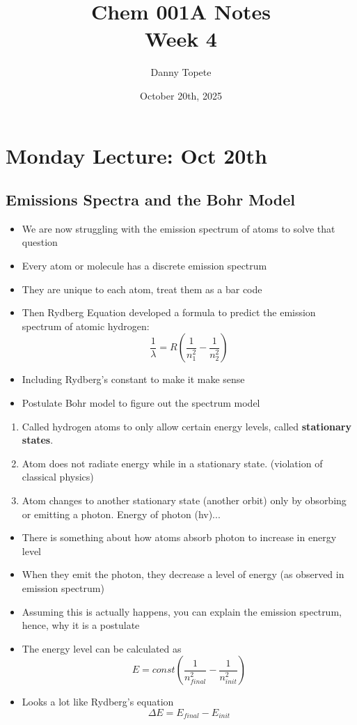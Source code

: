 \documentclass{article}
\title{Chem 001A Notes\\ Week 4}
\author{Danny Topete}
\date{October 20th, 2025}
\begin{document}
\maketitle
\section{Monday Lecture: Oct 20th}
\subsection{Emissions Spectra and the Bohr Model}
\begin{itemize}
  \item We are now struggling with the emission spectrum of atoms to solve that question
  \item Every atom or molecule has a discrete emission spectrum
  \item They are unique to each atom, treat them as a bar code
  \item Then Rydberg Equation developed a formula to predict the emission spectrum of atomic hydrogen:
    $$\frac{1}{\lambda{}} = R (\frac{1 }{n^2_1} - \frac{1}{n^2_2}) $$
  \item Including Rydberg's constant to make it make sense
  \item Postulate Bohr model to figure out the spectrum model
\end{itemize}
\begin{enumerate}
  \item Called hydrogen atoms to only allow certain energy levels,
    called \textbf{stationary states}.
  \item Atom does not radiate energy while in a stationary state. (violation of classical physics)
  \item Atom changes to another stationary state (another orbit) only by obsorbing
    or emitting a photon. Energy of photon (hv)...
\end{enumerate}
\begin{itemize}
  \item There is something about how atoms absorb photon to increase in energy level
  \item When they emit the photon, they decrease a level of energy (as observed in emission spectrum)
  \item Assuming this is actually happens, you can explain the emission spectrum, hence, why it is a postulate
  \item The energy level can be calculated as
    $$ E = const (\frac{1}{n^2_{final}} - \frac{1}{n^2_{init}}) $$
  \item Looks a lot like Rydberg's equation
    $$ \Delta{}E = E_{final} - E_{init} $$
\end{itemize}
\end{document}

